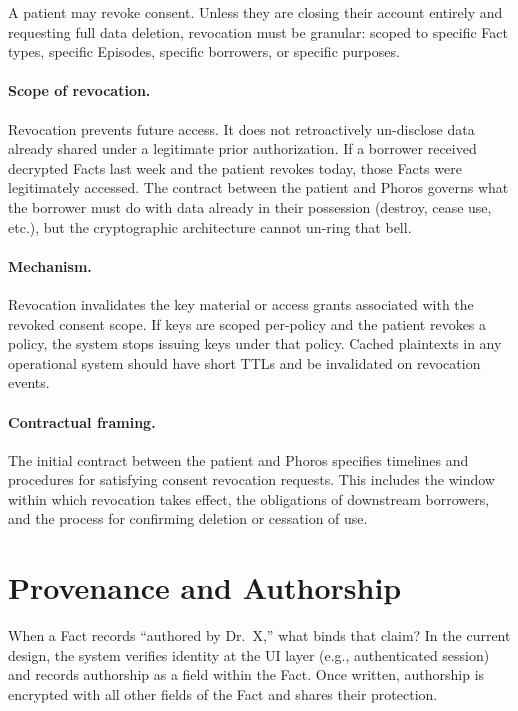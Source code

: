 \documentclass[11pt]{article}
\begin{document}
A patient may revoke consent. Unless they are closing their account
entirely and requesting full data deletion, revocation must be granular:
scoped to specific Fact types, specific Episodes, specific borrowers, or
specific purposes.

\paragraph{Scope of revocation.}
Revocation prevents future access. It does not retroactively un-disclose
data already shared under a legitimate prior authorization. If a
borrower received decrypted Facts last week and the patient revokes
today, those Facts were legitimately accessed. The contract between the
patient and Phoros governs what the borrower must do with data already
in their possession (destroy, cease use, etc.), but the cryptographic
architecture cannot un-ring that bell.

\paragraph{Mechanism.}
Revocation invalidates the key material or access grants associated with
the revoked consent scope. If keys are scoped per-policy and the patient
revokes a policy, the system stops issuing keys under that policy.
Cached plaintexts in any operational system should have short TTLs and
be invalidated on revocation events.

\paragraph{Contractual framing.}
The initial contract between the patient and Phoros specifies timelines
and procedures for satisfying consent revocation requests. This includes
the window within which revocation takes effect, the obligations of
downstream borrowers, and the process for confirming deletion or
cessation of use.

\section{Provenance and Authorship}
\label{sec:provenance}

When a Fact records ``authored by Dr.~X,'' what binds that claim? In the
current design, the system verifies identity at the UI layer (e.g.,
authenticated session) and records authorship as a field within the
Fact. Once written, authorship is encrypted with all other fields of the
Fact and shares their protection.
\end{document}

